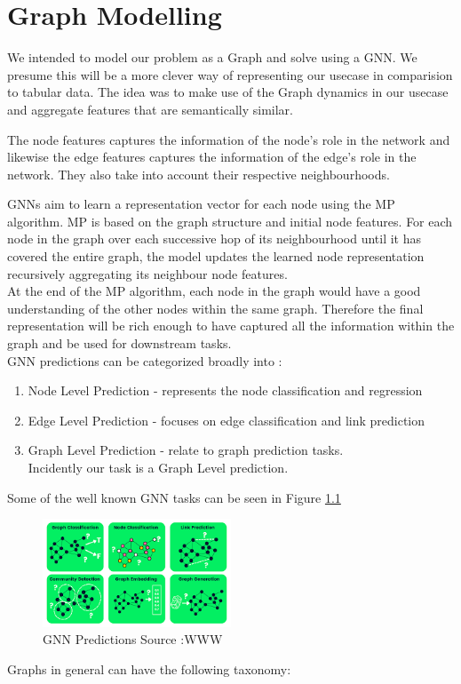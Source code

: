 \documentclass{report} %
\begin{document}
\chapter{Graph Modelling} 

We intended to model our problem as a Graph and solve using a \ac{GNN}. 
We presume this will be a more clever way of representing our usecase in comparision to tabular data.
The idea was to make use of the Graph dynamics in our usecase and aggregate features that are semantically similar.

The node features captures the information of the node's role in the network and likewise the edge features captures the information of the edge's role in the network.
They also take into account their respective neighbourhoods.

\ac{GNN}s aim to learn a representation vector for each node using the \ac{MP} algorithm.
\ac{MP} is based on the graph structure and initial node features.
For each node in the graph over each successive hop of its neighbourhood until it has covered the entire graph, the model updates the learned node representation recursively aggregating its neighbour node features.\\
At the end of the \ac{MP} algorithm, each node in the graph would have a good understanding of the other nodes within the same graph.
Therefore the final representation will be rich enough to have captured all the information within the graph and be used for downstream tasks.\\

\ac{GNN} predictions can be categorized broadly into : \cite{GNN-2019}
\begin{enumerate}
    \item Node Level Prediction - represents the node classification and regression
    \item Edge Level Prediction - focuses on edge classification and link prediction
    \item Graph Level Prediction - relate to graph prediction tasks.\\
    Incidently our task is a Graph Level prediction.
\end{enumerate}

Some of the well known \ac{GNN} tasks can be seen in Figure \ref{fig:GNN Predictions}
\begin{figure}[H]
    \centering
    \includegraphics[width=0.5\textwidth]{./ReportImages/GraphTasks.png} 
    \caption{\ac{GNN} Predictions Source :WWW} 
    \label{fig:GNN Predictions}
\end{figure}
Graphs in general can have the following taxonomy: \cite{GNN-2019}
\end{document}
